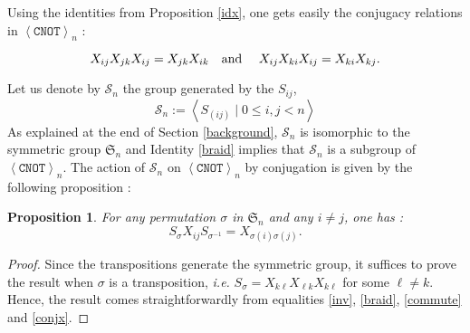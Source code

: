 \documentclass[a4paper,12pt,fleqn]{article}
\newcommand\cnot{\mathtt{CNOT}}
\newcommand\SYM[1][n]{\mathfrak{S}_{#1}}
\newcommand\XG[1][n]{\left<\cnot\right>_{#1}}
\newcommand\SG[1][n]{\mathcal{S}_{#1}}
\renewcommand\leq{\leqslant}
\newtheorem{prop}[theo]{Proposition}
\begin{document}
Using the identities from Proposition \ref{idx}, one gets easily the conjugacy relations in $\XG$ :
\vspace{-5mm}

\begin{equation}
  X_{ij}X_{jk}X_{ij}=X_{jk}X_{ik} \text{\quad and \quad  } X_{ij}X_{ki}X_{ij}=X_{ki}X_{kj}. \label{conjx}
\end{equation}


Let us denote by $\SG$ the group generated by the $S_{ij}$,
\begin{equation}\SG := \left<S_{(ij)}\mid  0\leq i,j < n\right>\end{equation}
As explained at the end of Section \ref{background}, $\SG$ is isomorphic to the symmetric group $\SYM$ and Identity \eqref{braid} implies that $\SG$ is a subgroup of $\XG$.
The action of $\SG$ on $\XG$ by conjugation is given by the following proposition :

\begin{prop} For any permutation $\sigma$ in $\SYM$ and any $i\neq j$, one has :
\begin{equation}\label{actionxsym} S_{\sigma}X_{ij}S_{\sigma^{-1}}=X_{\sigma(i)\sigma(j)}.\end{equation}
\end{prop}

\begin{proof}
  Since the transpositions generate the symmetric group, it suffices to 
prove the result when $\sigma$ is a transposition, \textit{i.e.} 
$S_\sigma=X_{k\ell}X_{\ell k}X_{k\ell}$ for some $\ell\neq k$. Hence, 
the result comes straightforwardly from equalities \eqref{inv}, \eqref{braid}, \eqref{commute} and \eqref{conjx}.
\end{proof}
\end{document}
